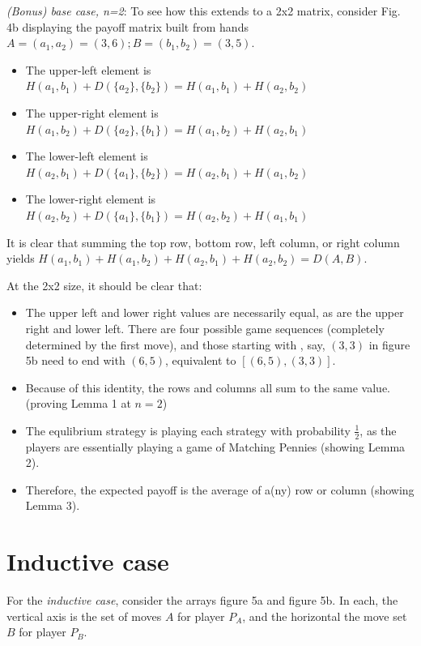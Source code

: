 \documentclass[11pt, oneside]{article} 	%
\begin{document}
\emph{(Bonus) base case, n=2}: To see how this extends to a 2x2 matrix, consider Fig. 4b displaying the payoff matrix built from hands $A = (a_1, a_2) = (3, 6); B = (b_1,b_2) = (3,5)$.

\begin{itemize}
\item The upper-left element is $H(a_1, b_1) + D(\{a_2\}, \{b_2\}) = H(a_1, b_1) + H(a_2, b_2)$
\item The upper-right element is $H(a_1, b_2) + D(\{a_2\}, \{b_1\}) = H(a_1, b_2)  + H(a_2, b_1)$
\item The lower-left element is $H(a_2, b_1) + D(\{a_1\}, \{b_2\}) = H(a_2, b_1) + H(a_1, b_2)$
\item The lower-right element is $H(a_2, b_2) + D(\{a_1\}, \{b_1\}) = H(a_2, b_2) + H(a_1, b_1)$
\end{itemize}

It is clear that summing the top row, bottom row, left column, or right column yields $H(a_1, b_1)  + H(a_1, b_2)  + H(a_2, b_1) +  H(a_2, b_2) = D(A,B)$.  

At the 2x2 size, it should be clear that:
\begin{itemize}
\item The upper left and lower right values are necessarily equal, as are the upper right and lower left.  There are four possible game sequences (completely determined by the first move), and those starting with , say, $(3,3)$ in figure 5b need to end with $(6,5)$, equivalent to $[(6,5), (3,3)]$.
\item Because of this identity, the rows and columns all sum to the same value. (proving Lemma 1 at $n=2$)
\item The equlibrium strategy is playing each strategy with probability $\frac{1}{2}$, as the players are essentially playing a game of Matching Pennies\cite{1}  (showing Lemma 2).
\item Therefore, the expected payoff is the average of a(ny) row or column (showing Lemma 3).
\end{itemize}

\section{Inductive case}

For the \emph{inductive case}, consider the arrays figure 5a and figure 5b.  In each, the vertical axis is the set of moves $A$ for player $P_A$, and the horizontal the move set $B$ for player $P_B$.
\end{document}
